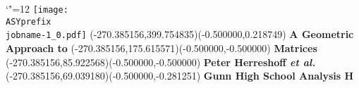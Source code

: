 \setlength{\unitlength}{1pt}
\makeatletter%
\let\ASYencoding\f@encoding%
\let\ASYfamily\f@family%
\let\ASYseries\f@series%
\let\ASYshape\f@shape%
\makeatother%
{\catcode`"=12%
\texttt{[image: \\ASYprefix\\jobname-1\_0.pdf]}%
}%
\color{ASYcolor}
\fontsize{12.000000}{14.400000}\selectfont
\usefont{\ASYencoding}{\ASYfamily}{\ASYseries}{\ASYshape}%
\ASYalign(-270.385156,399.754835)(-0.500000,0.218749){{\bfseries \fontsize{36}{48} \selectfont A Geometric Approach to}}%
\color{ASYcolor}
\fontsize{12.000000}{14.400000}\selectfont
\ASYalign(-270.385156,175.615571)(-0.500000,-0.500000){{\bfseries \fontsize{84}{112} \selectfont Matrices}}%
\color{ASYcolor}
\fontsize{12.000000}{14.400000}\selectfont
\ASYalign(-270.385156,85.922568)(-0.500000,-0.500000){{\bfseries \fontsize{18}{24} \selectfont Peter Herreshoff \textit{et al.}}}%
\color{ASYcolor}
\fontsize{12.000000}{14.400000}\selectfont
\ASYalign(-270.385156,69.039180)(-0.500000,-0.281251){{\bfseries \fontsize{12}{16} \selectfont Gunn High School Analysis H}}%
